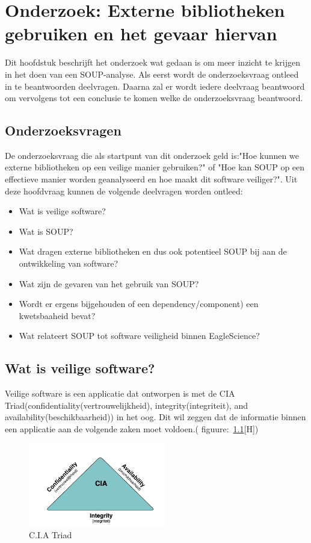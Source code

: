 \chapter{Onderzoek: Externe bibliotheken gebruiken en het gevaar hiervan}\label{ch:onderzoek:-SOUP-analyse}
Dit hoofdstuk beschrijft het onderzoek wat gedaan is om meer inzicht te krijgen in het doen van een SOUP-analyse. Als eerst wordt de onderzoeksvraag ontleed in te beantwoorden deelvragen. Daarna zal er wordt iedere deelvraag beantwoord om vervolgens tot een conclusie te komen welke de onderzoeksvraag beantwoord.

\section{Onderzoeksvragen} \label{sec:SOUPOnderzoeksvragen}
De onderzoeksvraag die als startpunt van dit onderzoek geld is:"Hoe kunnen we externe bibliotheken op een veilige manier gebruiken?" of "Hoe kan SOUP op een effectieve manier worden geanalyseerd en hoe maakt dit software veiliger?". Uit deze hoofdvraag kunnen de volgende deelvragen worden ontleed:
\begin{itemize}
    \item Wat is veilige software?
    \item Wat is SOUP?
    \item Wat dragen externe bibliotheken en dus ook potentieel SOUP bij aan de ontwikkeling van software?
    \item Wat zijn de gevaren van het gebruik van SOUP?
    \item Wordt er ergens bijgehouden of een dependency/component) een kwetsbaaheid bevat?
    \item Wat relateert SOUP tot software veiligheid binnen EagleScience?
\end{itemize}


\section{Wat is veilige software?}
Veilige software is een applicatie dat ontworpen is met de CIA Triad(confidentiality(vertrouwelijkheid), integrity(integriteit), and availability(beschikbaarheid)) in het oog. Dit wil zeggen dat de informatie binnen een applicatie aan de volgende zaken moet voldoen.( figuure:~\ref{fig:CIA}[H])
\begin{figure}
    \centering
    \includegraphics[width=6cm]{gfx/CIA}
    \caption{C.I.A Triad}
    \label{fig:CIA}
\end{figure}

